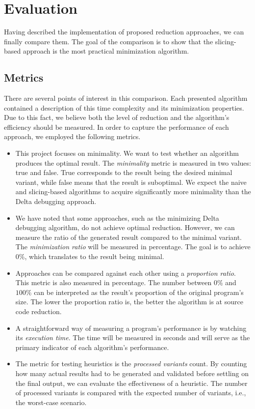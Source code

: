\chapter{Evaluation}\label{chap:evaluation}

Having described the implementation of proposed reduction approaches, we can 
finally compare them. 
The goal of the comparison is to show that the slicing-based approach is 
the most practical minimization algorithm.

\section{Metrics}\label{chap:metrics}

There are several points of interest in this comparison. 
Each presented algorithm contained a description of this time complexity and 
its minimization properties. 
Due to this fact, we believe both the level of reduction and the algorithm's 
efficiency should be measured. 
In order to capture the performance of each approach, we employed 
the following metrics.
\begin{itemize}
\item This project focuses on minimality. 
  We want to test whether an algorithm produces the optimal result. 
  The \emph{minimality} metric is measured in two values: true and false. 
  True corresponds to the result being the desired minimal variant, while 
  false means that the result is suboptimal.
   We expect the naive and slicing-based algorithms to acquire significantly 
   more minimality than the Delta debugging approach.
  \item We have noted that some approaches, such as the minimizing Delta 
  debugging algorithm, do not achieve optimal reduction. 
  However, we can measure the ratio of the generated result compared to 
  the minimal variant. 
  The \emph{minimization ratio} will be measured in percentage. 
  The goal is to achieve $0\%$, which translates to the result being minimal.
  \item{Approaches} can be compared against each other using 
  a \emph{proportion ratio}. 
  This metric is also measured in percentage. 
  The number between $0\%$ and $100\%$ can be interpreted as the result's 
  proportion of the original program's size. 
  The lower the proportion ratio is, the better the algorithm is at source 
  code reduction.
  \item A straightforward way of measuring a program's performance is by 
  watching its \emph{execution time}. 
  The time will be measured in seconds and will serve as the primary 
  indicator of each algorithm's performance.
  \item The metric for testing heuristics is the \emph{processed variants} 
  count. 
  By counting how many actual results had to be generated and validated 
  before settling on the final output, we can evaluate the effectiveness of 
  a heuristic.
  The number of processed variants is compared with the expected number 
  of variants, i.e., the worst-case scenario.
\end{itemize}
